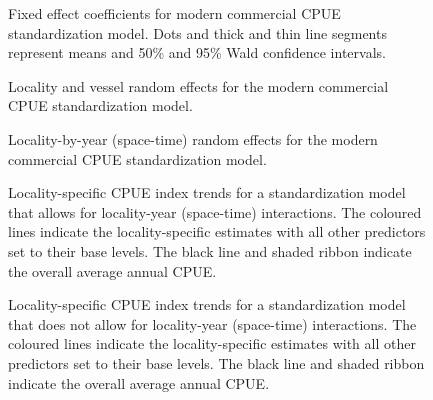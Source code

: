 \documentclass[11pt]{book}
\begin{document}
\begin{figure}[htb]

{\centering {} 

}

\caption{Fixed effect coefficients for modern commercial CPUE standardization model. Dots and thick and thin line segments represent means and 50\% and 95\% Wald confidence intervals.}\label{fig:cpue-coef-plot1-modern}
\end{figure}
\begin{figure}[htb]

{\centering {} 

}

\caption{Locality and vessel random effects for the modern commercial CPUE standardization model.}\label{fig:cpue-coef-plot2-modern}
\end{figure}
\begin{figure}[htb]

{\centering {} 

}

\caption{Locality-by-year (space-time) random effects for the modern commercial CPUE standardization model.}\label{fig:cpue-coef-plot3-modern}
\end{figure}
\begin{figure}[htb]

{\centering {} 

}

\caption{Locality-specific CPUE index trends for a standardization model that allows for locality-year (space-time) interactions. The coloured lines indicate the locality-specific estimates with all other predictors set to their base levels. The black line and shaded ribbon indicate the overall average annual CPUE.}\label{fig:cpue-re-int-ts}
\end{figure}
\begin{figure}[htb]

{\centering {} 

}

\caption{Locality-specific CPUE index trends for a standardization model that does not allow for locality-year (space-time) interactions. The coloured lines indicate the locality-specific estimates with all other predictors set to their base levels. The black line and shaded ribbon indicate the overall average annual CPUE.}\label{fig:cpue-re-no-int-ts}
\end{figure}
\end{document}
